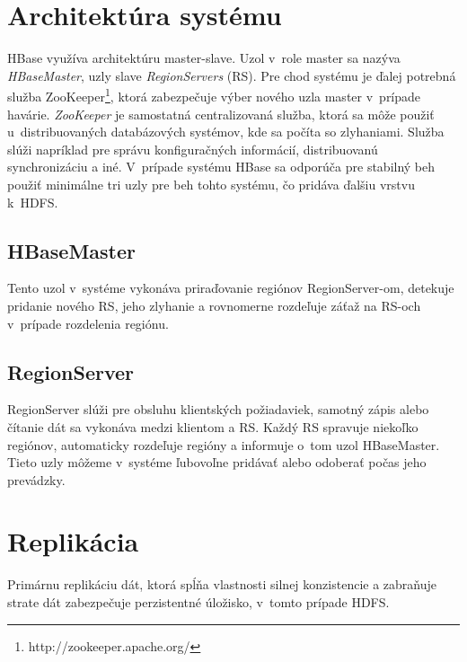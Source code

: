 \documentclass[11pt,twoside,a4paper]{book}
\begin{document}
\section{Architektúra systému}

HBase využíva architektúru master-slave. Uzol v~role master sa nazýva \emph{HBaseMaster}, uzly slave \emph{RegionServers} (RS). Pre chod systému je ďalej potrebná služba ZooKeeper\footnote{http://zookeeper.apache.org/}, ktorá zabezpečuje výber nového uzla master v~prípade havárie. \emph{ZooKeeper} je samostatná centralizovaná služba, ktorá sa môže použiť u~distribuovaných databázových systémov, kde sa počíta so zlyhaniami. Služba slúži napríklad pre správu konfiguračných informácií, distribuovanú synchronizáciu a iné. V~prípade systému HBase sa odporúča pre stabilný beh použiť minimálne tri uzly pre beh tohto systému, čo pridáva ďalšiu vrstvu k~HDFS.


\subsection*{HBaseMaster}

Tento uzol v~systéme vykonáva priraďovanie regiónov RegionServer-om, detekuje pridanie nového RS, jeho zlyhanie a rovnomerne rozdeľuje záťaž na RS-och v~prípade rozdelenia regiónu.

\subsection*{RegionServer}

RegionServer slúži pre obsluhu klientských požiadaviek, samotný zápis alebo čítanie dát sa vykonáva medzi klientom a RS. Každý RS spravuje niekoľko regiónov, automaticky rozdeľuje regióny a informuje o~tom uzol HBaseMaster. Tieto uzly môžeme v~systéme ľubovoľne pridávať alebo odoberať počas jeho prevádzky.




\section{Replikácia}
Primárnu replikáciu dát, ktorá spĺňa vlastnosti silnej konzistencie a zabraňuje strate dát zabezpečuje perzistentné úložisko, v~tomto prípade HDFS.
\end{document}
